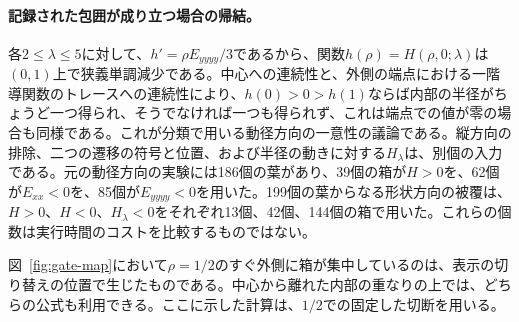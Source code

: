 \paragraph{記録された包囲が成り立つ場合の帰結。}
各$2\le\lambda\le5$に対して、$h'=\rho E_{yyyy}/3$であるから、関数$h(\rho)=H(\rho,0;\lambda)$は$(0,1)$上で狭義単調減少である。中心への連続性と、外側の端点における一階導関数のトレースへの連続性により、$h(0)>0>h(1)$ならば内部の半径がちょうど一つ得られ、そうでなければ一つも得られず、これは端点での値が零の場合も同様である。これが分類で用いる動径方向の一意性の議論である。縦方向の排除、二つの遷移の符号と位置、および半径の動きに対する$H_\lambda$は、別個の入力である。元の動径方向の実験には186個の葉があり、39個の箱が$H>0$を、62個が$E_{xx}<0$を、85個が$E_{yyyy}<0$を用いた。199個の葉からなる形状方向の被覆は、$H>0$、$H<0$、$H_\lambda<0$をそれぞれ13個、42個、144個の箱で用いた。これらの個数は実行時間のコストを比較するものではない。

図~\ref{fig:gate-map}において$\rho=1/2$のすぐ外側に箱が集中しているのは、表示の切り替えの位置で生じたものである。中心から離れた内部の重なりの上では、どちらの公式も利用できる。ここに示した計算は、$1/2$での固定した切断を用いる。
